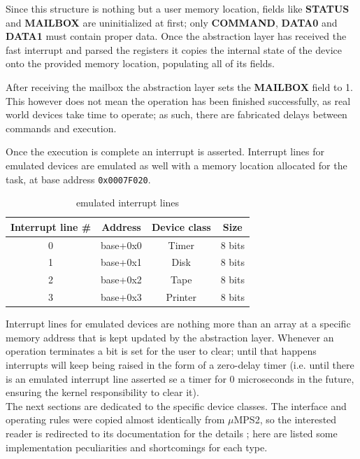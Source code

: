 \documentclass[12pt,a4paper,openright,twoside]{report}
\begin{document}
Since this structure is nothing but a user memory location, fields like \textbf{STATUS}
and \textbf{MAILBOX} are uninitialized at first; only \textbf{COMMAND}, \textbf{DATA0} and \textbf{DATA1}
must contain proper data. Once the abstraction layer has received the fast interrupt
and parsed the registers it copies the internal state of the device onto the
provided memory location, populating all of its fields.

After receiving the mailbox the abstraction layer sets the \textbf{MAILBOX} field
to 1. This however does not mean the operation has been finished successfully, as 
real world devices take time to operate; as such, there are fabricated delays between
commands and execution.

Once the execution is complete an interrupt is asserted. Interrupt lines for emulated
devices are emulated as well with a memory location allocated for the task, at 
base address {\tt 0x0007F020}.

\begin{table}[h]
\begin{center}
    \begin{tabular}{|c|c|c|c|}
    \hline
    \rowcolor[HTML]{C0C0C0} 
    Interrupt line \# & Address  & Device class & Size   \\ \hline
    0                 & base+0x0 & Timer        & 8 bits \\ \hline
    1                 & base+0x1 & Disk         & 8 bits \\ \hline
    2                 & base+0x2 & Tape         & 8 bits \\ \hline
    3                 & base+0x3 & Printer      & 8 bits \\ \hline
    \end{tabular}
 \caption[Table 2]{emulated interrupt lines}\label{tab:reg}
\end{center}
\end{table}

Interrupt lines for emulated devices are nothing more than an array at a specific
memory address that is kept updated by the abstraction layer. Whenever an operation
terminates a bit is set for the user to clear; until that happens interrupts will
keep being raised in the form of a zero-delay timer (i.e. until there is an emulated
interrupt line asserted se a timer for 0 microseconds in the future, ensuring
the kernel responsibility to clear it).\\

The next sections are dedicated to the specific device classes. The interface and
operating rules were copied almost identically from $\mu$MPS2, so the interested
reader is redirected to its documentation for the details \cite{pop}; here are listed
some implementation peculiarities and shortcomings for each type.
\end{document}
